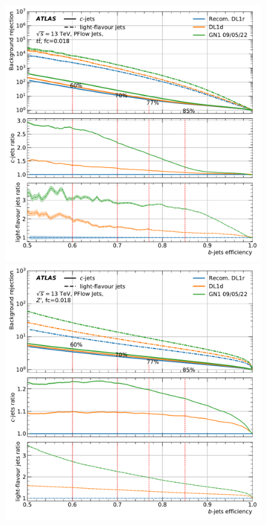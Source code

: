 %
\begin{center}
\vspace{-1.cm}
\begin{figure}[h!]
\centerline{
\includegraphics[scale=0.45]{Images/FTAG/Reprocessed/plotting_alone/ttbar_comparisons_300.pdf}
\includegraphics[scale=0.45]{Images/FTAG/Reprocessed/plotting_alone/zp_comparisons_300.pdf}
}
\end{figure}
\end{center}
